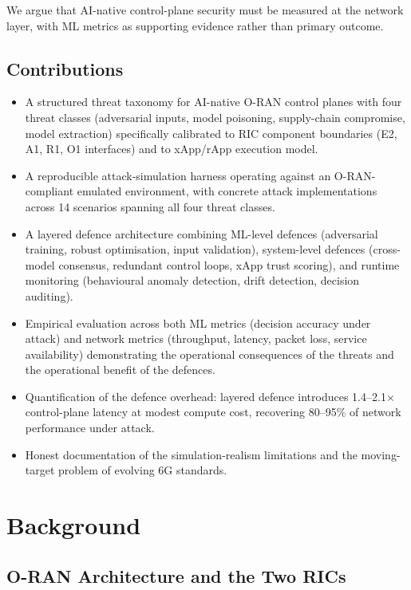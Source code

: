\documentclass[sigconf,nonacm]{acmart}
\begin{document}
We argue that AI-native control-plane security must be measured
at the network layer, with ML metrics as supporting evidence
rather than primary outcome.

\subsection{Contributions}

\begin{itemize}
  \item A structured threat taxonomy for AI-native O-RAN control
        planes with four threat classes (adversarial inputs, model
        poisoning, supply-chain compromise, model extraction)
        specifically calibrated to RIC component boundaries (E2,
        A1, R1, O1 interfaces) and to xApp/rApp execution model.
  \item A reproducible attack-simulation harness operating against
        an O-RAN-compliant emulated environment, with concrete
        attack implementations across 14 scenarios spanning all
        four threat classes.
  \item A layered defence architecture combining ML-level defences
        (adversarial training, robust optimisation, input
        validation), system-level defences (cross-model consensus,
        redundant control loops, xApp trust scoring), and runtime
        monitoring (behavioural anomaly detection, drift detection,
        decision auditing).
  \item Empirical evaluation across both ML metrics (decision
        accuracy under attack) and network metrics (throughput,
        latency, packet loss, service availability) demonstrating
        the operational consequences of the threats and the
        operational benefit of the defences.
  \item Quantification of the defence overhead: layered defence
        introduces 1.4--2.1$\times$ control-plane latency at modest
        compute cost, recovering 80--95\% of network performance
        under attack.
  \item Honest documentation of the simulation-realism limitations
        and the moving-target problem of evolving 6G standards.
\end{itemize}

\section{Background}

\subsection{O-RAN Architecture and the Two RICs}
\end{document}
